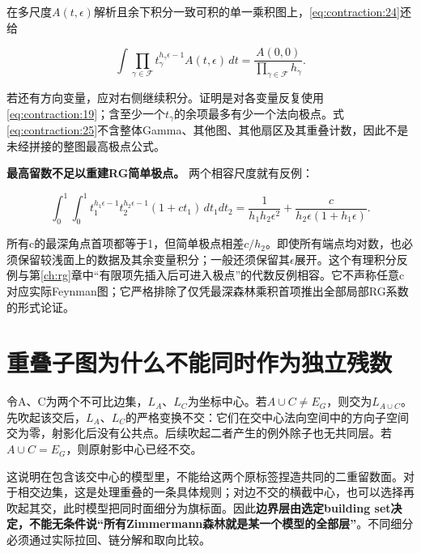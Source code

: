 \documentclass[11pt,a4paper,oneside]{ctexrep}
\theoremstyle{cnplain}
\theoremstyle{definition}
\theoremstyle{remark}
\begin{document}
在多尺度\(A(t,\epsilon )\)解析且余下积分一致可积的单一乘积图上，\eqref{eq:contraction:24}还给

\begin{equation}
[\epsilon^{-|\mathscr F|}]\int\prod_{\gamma\in\mathscr F}
                t_\gamma^{h_\gamma\epsilon-1}A(t,\epsilon)\,dt
                       =\frac{A(0,0)}{\prod_{\gamma\in\mathscr F}h_\gamma}.
                                                                    \label{eq:contraction:25}
\end{equation}

若还有方向变量，应对右侧继续积分。证明是对各变量反复使用\eqref{eq:contraction:19}；含至少一个\(t_\gamma \)的余项最多有少一个法向极点。式\eqref{eq:contraction:25}不含整体Gamma、其他图、其他扇区及其重叠计数，因此不是未经拼接的整图最高极点公式。

\textbf{最高留数不足以重建RG简单极点。} 两个相容尺度就有反例：

\begin{equation}
\int_0^1\!\int_0^1
 t_1^{h_1\epsilon-1}t_2^{h_2\epsilon-1}(1+c t_1)\,dt_1dt_2
 =\frac1{h_1h_2\epsilon^2}
                  +\frac{c}{h_2\epsilon(1+h_1\epsilon)}.         \label{eq:contraction:25a}
\end{equation}

所有c的最深角点首项都等于1，但简单极点相差\(c/h_2\)。即使所有端点均对数，也必须保留较浅面上的数据及其余变量积分；一般还须保留其\(\epsilon \)展开。这个有理积分反例与第\ref{ch:rg}章中``有限项先插入后可进入极点''的代数反例相容。它不声称任意c对应实际Feynman图；它严格排除了仅凭最深森林乘积首项推出全部局部RG系数的形式论证。

\section{重叠子图为什么不能同时作为独立残数}\label{sec:contraction:7}

令A、C为两个不可比边集，\(L_A\)、\(L_C\)为坐标中心。若\(A\cup C\ne E_G\)，则交为\(L_{A\cup C}\)。先吹起该交后，\(L_A\)、\(L_C\)的严格变换不交：它们在交中心法向空间中的方向子空间交为零，射影化后没有公共点。后续吹起二者产生的例外除子也无共同层。若\(A\cup C=E_G\)，则原射影中心已经不交。

这说明在包含该交中心的模型里，不能给这两个原标签捏造共同的二重留数面。对于相交边集，这是处理重叠的一条具体规则；对边不交的横截中心，也可以选择再吹起其交，此时模型把同时面细分为旗标面。因此\textbf{边界层由选定building set决定，不能无条件说``所有Zimmermann森林就是某一个模型的全部层''}。不同细分必须通过实际拉回、链分解和取向比较。
\end{document}
